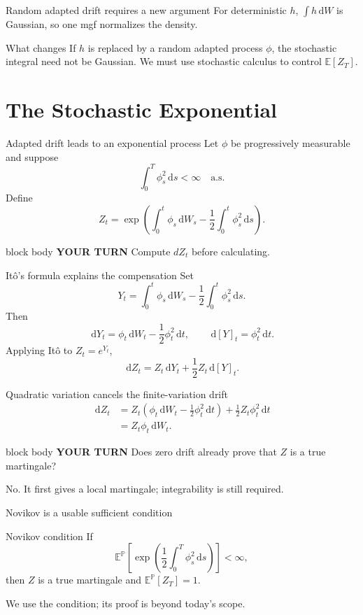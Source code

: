 \documentclass[handout,10pt,aspectratio=169]{beamer}
\newenvironment{pausebox}{\begin{beamercolorbox}[rounded=true,sep=0.8em,wd=\textwidth]{block body}
  \textbf{\color{CourseGold}YOUR TURN}\quad}{\end{beamercolorbox}}
\newcommand{\dd}{\,\mathrm d}
\newcommand{\E}{\mathbb E}
\newcommand{\Pp}{\mathbb P}
\newcommand{\1}{\mathbf 1}
\begin{document}
\begin{frame}{Random adapted drift requires a new argument}
For deterministic \(h\), \(\int h\dd W\) is Gaussian, so one mgf
normalizes the density.
\begin{alertblock}{What changes}
If \(h\) is replaced by a random adapted process \(\phi\), the stochastic
integral need not be Gaussian. We must use stochastic calculus to control
\(\E[Z_T]\).
\end{alertblock}
\end{frame}



\section{The Stochastic Exponential}

\begin{frame}{Adapted drift leads to an exponential process}
Let \(\phi\) be progressively measurable and suppose
\[
\int_0^T\phi_s^2\dd s<\infty\quad\text{a.s.}
\]
Define
\[
Z_t=\exp\!\left(
\int_0^t\phi_s\dd W_s-\frac12\int_0^t\phi_s^2\dd s
\right).
\]
\begin{pausebox}
Compute \(dZ_t\) before calculating.
\end{pausebox}
\end{frame}

\begin{frame}{It\^o's formula explains the compensation}
Set
\[
Y_t=\int_0^t\phi_s\dd W_s-\frac12\int_0^t\phi_s^2\dd s.
\]
Then
\[
\dd Y_t=\phi_t\dd W_t-\frac12\phi_t^2\dd t,
\qquad
\dd[Y]_t=\phi_t^2\dd t.
\]
Applying It\^o to \(Z_t=e^{Y_t}\),
\[
\dd Z_t=Z_t\dd Y_t+\frac12Z_t\dd[Y]_t.
\]
\end{frame}

\begin{frame}{Quadratic variation cancels the finite-variation drift}
\[
\begin{aligned}
\dd Z_t
&=Z_t\left(\phi_t\dd W_t-\frac12\phi_t^2\dd t\right)
+\frac12Z_t\phi_t^2\dd t\\
&=\boxed{Z_t\phi_t\dd W_t}.
\end{aligned}
\]
\begin{pausebox}
Does zero drift already prove that \(Z\) is a true martingale?
\end{pausebox}

No. It first gives a local martingale; integrability is still required.
\end{frame}


\begin{frame}{Novikov is a usable sufficient condition}
\begin{block}{Novikov condition}
If
\[
\boxed{
\E^\Pp\!\left[
\exp\!\left(\frac12\int_0^T\phi_s^2\dd s\right)
\right]<\infty,}
\]
then \(Z\) is a true martingale and \(\E^\Pp[Z_T]=1\).
\end{block}
We use the condition; its proof is beyond today's scope.
\end{frame}
\end{document}
